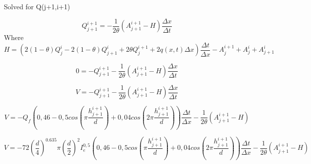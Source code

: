 Solved for Q(j+1,i+1)

\begin{equation}
	Q_{j+1}^{i+1} = - \frac{1}{2\theta}\left(A_{j+1}^{i+1}-H\right)\frac{\Delta x}{\Delta t}
\end{equation}
Where 
\begin{equation}
	H = \left(2(1-\theta)Q_j^i-2(1-\theta)Q_{j+1}^i+2\theta Q_j^{i+1}+2q(x,t)\Delta x\right)\frac{\Delta t}{\Delta x}- A_{j}^{i+1}+A_j^i+A_{j+1}^i
\end{equation}

\begin{equation}
		0=-Q_{j+1}^{i+1}  - \frac{1}{2\theta}\left(A_{j+1}^{i+1}-H\right)\frac{\Delta x}{\Delta t}
\end{equation}

\begin{equation}
		V=-Q_{j+1}^{i+1}  - \frac{1}{2\theta}\left(A_{j+1}^{i+1}-H\right)\frac{\Delta x}{\Delta t}
\end{equation}

\begin{equation}
	V = -Q_f\left(0,46-0,5cos\left(\pi \frac{h_{j+1}^{i+1}}{d}\right)+0,04cos\left(2\pi\frac{h_{j+1}^{i+1}}{d}\right)\right)\frac{\Delta t}{\Delta x}-\frac{1}{2\theta}\left(A_{j+1}^{i+1}-H\right)
\end{equation}

\begin{equation}
	V = -72\left(\frac{d}{4}\right)^{0.635}\pi\left(\frac{d}{2}\right)^2I_e^{0,5}\left(0,46-0,5cos\left(\pi \frac{h_{j+1}^{i+1}}{d}\right)+0,04cos\left(2\pi\frac{h_{j+1}^{i+1}}{d}\right)\right)\frac{\Delta t}{\Delta x}-\frac{1}{2\theta}\left(A_{j+1}^{i+1}-H\right)
\end{equation}


